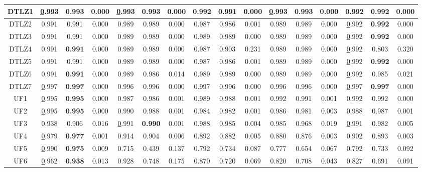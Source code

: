 \begin{table*}[t]
\begin{tabular}{c c|c|c|c|c|c|c|c|c|c|c|c|c|c|c}
\multicolumn{1}{c|}{DTLZ1} & {\ul 0.993} & \textbf{0.993} & 0.000 & {\ul 0.993} & \textbf{0.993} & 0.000 & 0.992 & 0.991 & 0.000 & {\ul 0.993} & \textbf{0.993} & 0.000 & 0.992 & 0.992 & 0.000 \\ \hline
\multicolumn{1}{c|}{DTLZ2} & 0.991 & 0.991 & 0.000 & 0.989 & 0.989 & 0.000 & 0.987 & 0.986 & 0.001 & 0.989 & 0.989 & 0.000 & {\ul 0.992} & \textbf{0.992} & 0.000 \\ \hline
\multicolumn{1}{c|}{DTLZ3} & 0.991 & 0.991 & 0.000 & 0.989 & 0.989 & 0.000 & 0.989 & 0.989 & 0.000 & 0.989 & 0.989 & 0.000 & {\ul 0.992} & \textbf{0.992} & 0.000 \\ \hline
\multicolumn{1}{c|}{DTLZ4} & 0.991 & \textbf{0.991} & 0.000 & 0.989 & 0.989 & 0.000 & 0.987 & 0.903 & 0.231 & 0.989 & 0.989 & 0.000 & {\ul 0.992} & 0.803 & 0.320 \\ \hline
\multicolumn{1}{c|}{DTLZ5} & 0.991 & 0.991 & 0.000 & 0.989 & 0.989 & 0.000 & 0.987 & 0.986 & 0.001 & 0.989 & 0.989 & 0.000 & {\ul 0.992} & \textbf{0.992} & 0.000 \\ \hline
\multicolumn{1}{c|}{DTLZ6} & 0.991 & \textbf{0.991} & 0.000 & 0.989 & 0.986 & 0.014 & 0.989 & 0.989 & 0.000 & 0.989 & 0.989 & 0.000 & {\ul 0.992} & 0.985 & 0.021 \\ \hline
\multicolumn{1}{c|}{DTLZ7} & {\ul 0.997} & \textbf{0.997} & 0.000 & 0.996 & 0.996 & 0.000 & 0.997 & 0.996 & 0.000 & 0.996 & 0.996 & 0.000 & {\ul 0.997} & \textbf{0.997} & 0.000 \\ \hline
\multicolumn{1}{c|}{UF1} & {\ul 0.995} & \textbf{0.995} & 0.000 & 0.987 & 0.986 & 0.001 & 0.989 & 0.988 & 0.001 & 0.992 & 0.991 & 0.001 & 0.992 & 0.992 & 0.000 \\ \hline
\multicolumn{1}{c|}{UF2} & {\ul 0.995} & \textbf{0.995} & 0.000 & 0.990 & 0.988 & 0.001 & 0.984 & 0.982 & 0.001 & 0.986 & 0.981 & 0.003 & 0.988 & 0.987 & 0.001 \\ \hline
\multicolumn{1}{c|}{UF3} & 0.938 & 0.906 & 0.016 & {\ul 0.991} & \textbf{0.990} & 0.001 & 0.988 & 0.985 & 0.004 & 0.985 & 0.968 & 0.019 & {\ul 0.991} & 0.982 & 0.005 \\ \hline
\multicolumn{1}{c|}{UF4} & {\ul 0.979} & \textbf{0.977} & 0.001 & 0.914 & 0.904 & 0.006 & 0.892 & 0.882 & 0.005 & 0.880 & 0.876 & 0.003 & 0.902 & 0.893 & 0.003 \\ \hline
\multicolumn{1}{c|}{UF5} & {\ul 0.990} & \textbf{0.975} & 0.009 & 0.715 & 0.439 & 0.137 & 0.792 & 0.734 & 0.087 & 0.777 & 0.654 & 0.067 & 0.792 & 0.733 & 0.092 \\ \hline
\multicolumn{1}{c|}{UF6} & {\ul 0.962} & \textbf{0.938} & 0.013 & 0.928 & 0.748 & 0.175 & 0.870 & 0.720 & 0.069 & 0.820 & 0.708 & 0.043 & 0.827 & 0.691 & 0.091 \\ \hline

\end{tabular}
\end{table*}
